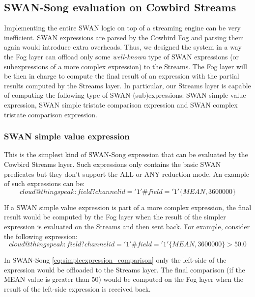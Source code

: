 \subsection{SWAN-Song evaluation on Cowbird Streams}
Implementing the entire SWAN logic on top of a streaming engine can be very inefficient. SWAN expressions are parsed by the Cowbird Fog and parsing them again would introduce extra overheads. 
Thus, we designed the system in a way the Fog layer can offload only some \emph{well-known} type of SWAN expressions (or subexpressions of a more complex expression) to the Streams. The Fog layer will be then in charge to compute the final result of an expression with the partial results computed by the Streams layer. In particular, our Streams layer is capable of computing the following type of SWAN-(sub)expressions: SWAN simple value expression, SWAN simple tristate comparison expression and SWAN complex tristate comparison expression. 

\subsubsection{SWAN simple value expression} 
This is the simplest kind of SWAN-Song expression that can be evaluated by the Cowbird Streams layer. Such expressions only contains the basic SWAN predicates but they don't support the ALL or ANY reduction mode. An example of such expressions can be:
\begin{equation}\label{eq:simpleexpression}
cloud@thingspeak:field?channelid='1'\#field='1'\big\{MEAN,3600000\big\}
\end{equation}

If a SWAN simple value expression is part of a more complex expression, the final result would be computed by the Fog layer when the result of the simpler expression is evaluated on the Streams and then sent back. For example, consider the following expression:
\begin{equation}\label{eq:simpleexpression_comparison}
cloud@thingspeak:field?channelid='1'\#field='1'\big\{MEAN,3600000\big\} > 50.0
\end{equation}

In SWAN-Song \ref{eq:simpleexpression_comparison} only the left-side of the expression would be offloaded to the Streams layer. The final comparison (if the MEAN value is greater than 50) would be computed on the Fog layer when the result of the left-side expression is received back.

